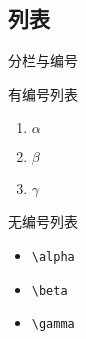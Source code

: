 \documentclass{bnuslides}
\begin{document}
\subsection{列表}
\begin{frame}{分栏与编号}
	\begin{multicols}{2}
		有编号列表
		\begin{enumerate}
			\item  $\alpha$
			\item  $\beta$
			\item $\gamma$
		\end{enumerate}

		无编号列表
		\begin{itemize}
			\item   \texttt{\textbackslash alpha}
			\item  \texttt{\textbackslash beta}
			\item             \texttt{\textbackslash gamma}
		\end{itemize}
	\end{multicols}
\end{frame}
\end{document}
